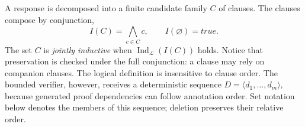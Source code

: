 A response is decomposed into a finite candidate family \(C\) of clauses.  The
clauses compose by conjunction,
\begin{equation}
  I(C)=\bigwedge_{c\in C}c,
  \qquad I(\varnothing)=\mathit{true}.
  \label{eq:formal-compose}
\end{equation}
The set \(C\) is \emph{jointly inductive} when
\(\operatorname{Ind}_{\mathcal L}(I(C))\) holds.  Notice that preservation is
checked under the full conjunction: a clause may rely on companion clauses.
The logical definition is insensitive to clause order.  The bounded verifier,
however, receives a deterministic sequence
\(D=\langle d_1,\ldots,d_m\rangle\), because generated proof dependencies can
follow annotation order.  Set notation below denotes the members of this
sequence; deletion preserves their relative order.

